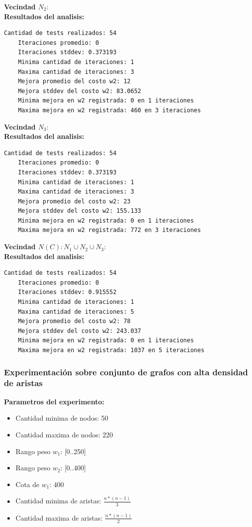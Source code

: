 \textbf{Vecindad $N_2$}:\\
\textbf{Resultados del analisis:}
\begin{lstlisting}[frame=single]
	Cantidad de tests realizados: 54
	Iteraciones promedio: 0
	Iteraciones stddev: 0.373193
	Minima cantidad de iteraciones: 1
	Maxima cantidad de iteraciones: 3
	Mejora promedio del costo w2: 12
	Mejora stddev del costo w2: 83.0652
	Minima mejora en w2 registrada: 0 en 1 iteraciones
	Maxima mejora en w2 registrada: 460 en 3 iteraciones
\end{lstlisting}

\textbf{Vecindad $N_3$}:\\
\textbf{Resultados del analisis:}
\begin{lstlisting}[frame=single]
	Cantidad de tests realizados: 54
	Iteraciones promedio: 0
	Iteraciones stddev: 0.373193
	Minima cantidad de iteraciones: 1
	Maxima cantidad de iteraciones: 3
	Mejora promedio del costo w2: 23
	Mejora stddev del costo w2: 155.133
	Minima mejora en w2 registrada: 0 en 1 iteraciones
	Maxima mejora en w2 registrada: 772 en 3 iteraciones
\end{lstlisting}

\textbf{Vecindad $N(C): N_1 \cup N_2 \cup N_3$}:\\
\textbf{Resultados del analisis:}
\begin{lstlisting}[frame=single]
	Cantidad de tests realizados: 54
	Iteraciones promedio: 0
	Iteraciones stddev: 0.915552
	Minima cantidad de iteraciones: 1
	Maxima cantidad de iteraciones: 5
	Mejora promedio del costo w2: 78
	Mejora stddev del costo w2: 243.037
	Minima mejora en w2 registrada: 0 en 1 iteraciones
	Maxima mejora en w2 registrada: 1037 en 5 iteraciones
\end{lstlisting}

\subsubsection{Experimentaci\'on sobre conjunto de grafos con alta densidad de aristas}

\textbf{Parametros del experimento:}
\begin{itemize}
	\item Cantidad minima de nodos: 50
	\item Cantidad maxima de nodos: 220
	\item Rango peso $w_1$: [0..250]
	\item Rango peso $w_2$: [0..400]
	\item Cota de $w_1$: 400
	\item Cantidad minima de aristas: $\frac{n * (n-1)}{3}$
	\item Cantidad maxima de aristas: $\frac{n * (n-1)}{2}$
\end{itemize}  

